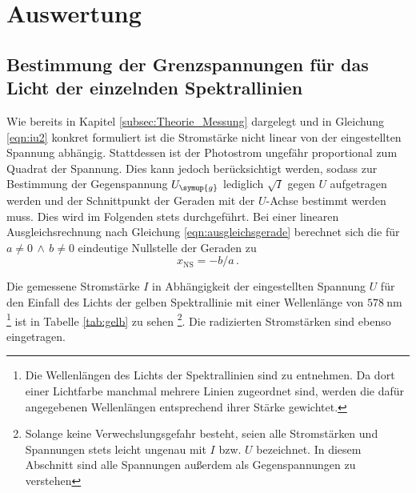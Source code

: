 \section{Auswertung}
\label{sec:Auswertung}
\subsection{Bestimmung der Grenzspannungen für das Licht der einzelnden Spektrallinien}
\label{subsec:grenzspannungen}
Wie bereits in Kapitel \ref{subsec:Theorie_Messung} dargelegt und in Gleichung \eqref{eqn:iu2} konkret
formuliert ist die Stromstärke nicht linear von der eingestellten Spannung abhängig.
Stattdessen ist der Photostrom ungefähr proportional zum Quadrat der Spannung. Dies
kann jedoch berücksichtigt werden, sodass zur Bestimmung der Gegenspannung $U_{\symup{g}}$
lediglich $\sqrt{I}$ gegen $U$ aufgetragen werden und der Schnittpunkt der Geraden
mit der $U$-Achse bestimmt werden muss. Dies wird im Folgenden stets durchgeführt.
Bei einer linearen Ausgleichsrechnung nach Gleichung
\eqref{eqn:ausgleichsgerade} berechnet sich die für $a \neq 0 \, \land \, b \neq 0$ eindeutige
Nullstelle der Geraden zu
\begin{equation*}
  x_\text{NS} = -b/a\,.
  \label{eqn:ns}
\end{equation*}

Die gemessene Stromstärke $I$ in Abhängigkeit der eingestellten Spannung $U$ für
den Einfall des Lichts der gelben Spektrallinie mit einer Wellenlänge von $\SI{578}{\nano\meter}$
\footnote{Die Wellenlängen des Lichts der Spektrallinien sind \cite{Versuchsanleitung} zu entnehmen.
Da dort einer Lichtfarbe manchmal mehrere Linien zugeordnet sind, werden die dafür angegebenen
Wellenlängen entsprechend ihrer Stärke gewichtet.}
ist in Tabelle \ref{tab:gelb} zu sehen \footnote{Solange keine Verwechslungsgefahr
besteht, seien alle Stromstärken und Spannungen stets leicht ungenau mit $I$ bzw. $U$ bezeichnet.
In diesem Abschnitt sind alle Spannungen außerdem als Gegenspannungen zu verstehen}. Die radizierten
Stromstärken sind ebenso eingetragen.

